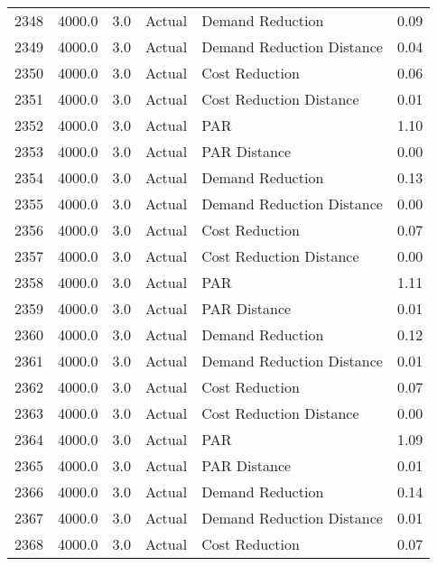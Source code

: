 \begin{longtable}{lrrllr}
2348 &       4000.0 &     3.0 &         Actual &           Demand Reduction &   0.09 \\
2349 &       4000.0 &     3.0 &         Actual &  Demand Reduction Distance &   0.04 \\
2350 &       4000.0 &     3.0 &         Actual &             Cost Reduction &   0.06 \\
2351 &       4000.0 &     3.0 &         Actual &    Cost Reduction Distance &   0.01 \\
2352 &       4000.0 &     3.0 &         Actual &                        PAR &   1.10 \\
2353 &       4000.0 &     3.0 &         Actual &               PAR Distance &   0.00 \\
2354 &       4000.0 &     3.0 &         Actual &           Demand Reduction &   0.13 \\
2355 &       4000.0 &     3.0 &         Actual &  Demand Reduction Distance &   0.00 \\
2356 &       4000.0 &     3.0 &         Actual &             Cost Reduction &   0.07 \\
2357 &       4000.0 &     3.0 &         Actual &    Cost Reduction Distance &   0.00 \\
2358 &       4000.0 &     3.0 &         Actual &                        PAR &   1.11 \\
2359 &       4000.0 &     3.0 &         Actual &               PAR Distance &   0.01 \\
2360 &       4000.0 &     3.0 &         Actual &           Demand Reduction &   0.12 \\
2361 &       4000.0 &     3.0 &         Actual &  Demand Reduction Distance &   0.01 \\
2362 &       4000.0 &     3.0 &         Actual &             Cost Reduction &   0.07 \\
2363 &       4000.0 &     3.0 &         Actual &    Cost Reduction Distance &   0.00 \\
2364 &       4000.0 &     3.0 &         Actual &                        PAR &   1.09 \\
2365 &       4000.0 &     3.0 &         Actual &               PAR Distance &   0.01 \\
2366 &       4000.0 &     3.0 &         Actual &           Demand Reduction &   0.14 \\
2367 &       4000.0 &     3.0 &         Actual &  Demand Reduction Distance &   0.01 \\
2368 &       4000.0 &     3.0 &         Actual &             Cost Reduction &   0.07 \\

\end{longtable}
